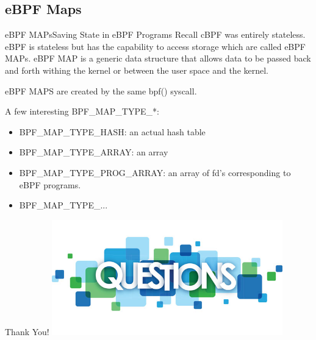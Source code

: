 \documentclass{beamer}
\begin{document}
\subsection{eBPF Maps}
\begin{frame}{eBPF MAPs}{Saving State in eBPF Programs}
Recall \alert{cBPF} was entirely stateless. \alert{eBPF} is stateless but has the capability to access storage which are called eBPF MAPs. eBPF MAP is a generic data structure that allows data to be passed back and forth withing the kernel or between the user space and the kernel.

eBPF MAPS are created by the same \alert{bpf()} syscall.

\vspace{0.5cm}
A few interesting \alert{BPF\_MAP\_TYPE\_*}:
\begin{itemize}
    \item BPF\_MAP\_TYPE\_HASH: an actual hash table
    \item BPF\_MAP\_TYPE\_ARRAY: an array
    \item BPF\_MAP\_TYPE\_PROG\_ARRAY: an array of fd's corresponding to eBPF programs.
    \item BPF\_MAP\_TYPE\_...
\end{itemize}
\end{frame}

\begin{frame}{Thank You!}
\centering
\includegraphics[height=5cm]{questions.png}
\end{frame}
\end{document}
